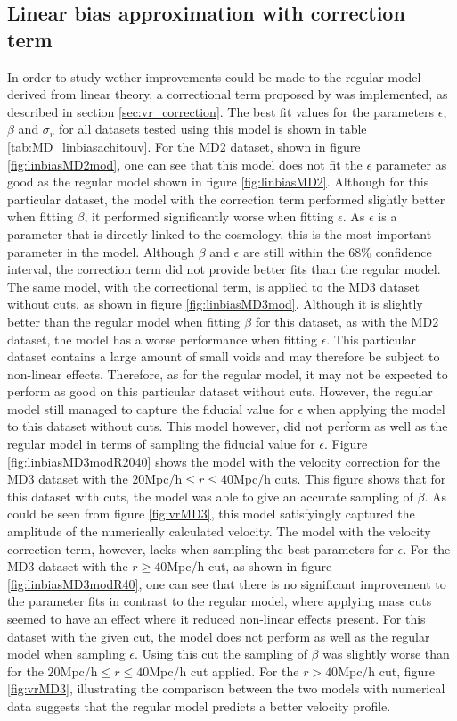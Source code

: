 \subsection{Linear bias approximation with correction term}
In order to study wether improvements could be made to the regular model derived from linear theory, a correctional term proposed by \cite{Achitouv_streaming} was implemented, as described in section \ref{sec:vr_correction}. The best fit values for the parameters $\epsilon$, $\beta$ and $\sigma_v$ for all datasets tested using this model is shown in table \ref{tab:MD_linbiasachitouv}. For the MD2 dataset, shown in figure \ref{fig:linbiasMD2mod}, one can see that this model does not fit the $\epsilon$ parameter as good as the regular model shown in figure \ref{fig:linbiasMD2}. Although for this particular dataset, the model with the correction term performed slightly better when fitting $\beta$, it performed significantly worse when fitting $\epsilon$. As $\epsilon$ is a parameter that is directly linked to the cosmology, this is the most important parameter in the model. Although $\beta$ and $\epsilon$ are still within the $68\%$ confidence interval, the correction term did not provide better fits than the regular model.\\\indent
The same model, with the correctional term, is applied to the MD3 dataset without cuts, as shown in figure \ref{fig:linbiasMD3mod}. Although it is slightly better than the regular model when fitting $\beta$ for this dataset, as with the MD2 dataset, the model has a worse performance when fitting $\epsilon$. This particular dataset contains a large amount of small voids and may therefore be subject to non-linear effects. Therefore, as for the regular model, it may not be expected to perform as good on this particular dataset without cuts. However, the regular model still managed to 
capture the fiducial value for $\epsilon$ when applying the model to this dataset without cuts. This model however, did not perform as well as the regular model in terms of sampling the fiducial value for $\epsilon$.
Figure \ref{fig:linbiasMD3modR2040} shows the model with the velocity correction for the MD3 dataset with the $20$Mpc/h$\leq r\leq 40$Mpc/h cuts. This figure shows that for this dataset with cuts, the model was able to give an accurate sampling of $\beta$. As could be seen from figure \ref{fig:vrMD3}, this model satisfyingly captured the amplitude of the numerically calculated velocity. The model with the velocity correction term, however, lacks when sampling the best parameters for $\epsilon$. For the MD3 dataset with the $r \geq 40$Mpc/h cut, as shown in figure \ref{fig:linbiasMD3modR40}, one can see that there is no significant improvement to the parameter fits in contrast to the regular model, where applying mass cuts seemed to have an effect where it reduced non-linear effects present. For this dataset with the given cut, the model does not perform as well as the regular model when sampling $\epsilon$. Using this cut the sampling of $\beta$ was slightly worse than for the $20$Mpc/h$\leq r\leq 40$Mpc/h cut applied. For the $r>40$Mpc/h cut, figure \ref{fig:vrMD3}, illustrating the comparison between the two models with numerical data suggests that the regular model predicts a better velocity profile.\\\indent
